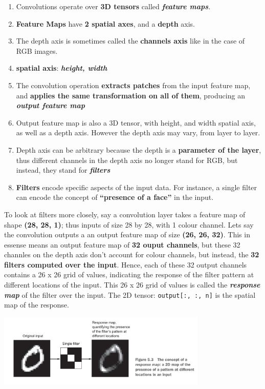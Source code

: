 \documentclass[12pt, a4paper]{article}
\begin{document}
\begin{enumerate}
\item Convolutions operate over \textbf{3D tensors} called \textbf{\textit{feature maps}}.
\item \textbf{Feature Maps} have \textbf{2 spatial axes}, and a \textbf{depth} axis.
\item The depth axis is sometimes called the \textbf{channels axis} like in the case of RGB images.
\item \textbf{spatial axis}: \textbf{\textit{height, width}}
\item The convolution operation \textbf{extracts patches} from the input feature map, and
\textbf{applies the same transformation on all of them}, producing an \textbf{\textit{output feature map}}
\item Output feature map is also a 3D tensor, with height, and width spatial axis,
as well as a depth axis. However the depth axis may vary, from layer to layer.
\item Depth axis can be arbitrary because the depth is a \textbf{parameter of the layer},
thus different channels in the depth axis no longer stand for RGB, but instead,
they stand for \textbf{\textit{filters}}
\item \textbf{Filters} encode specific aspects of the input data. For instance, a 
single filter can encode the concept of \textbf{``presence of a face''} in the input.
\end{enumerate}

To look at filters more closely, say a convolution layer takes a feature map of
shape \textbf{(28, 28, 1)}; thus inputs of size 28 by 28, with 1 colour channel.
Lets say the convolution outputs a an output feature map of size \textbf{(26, 26, 32)}.
This in essense means an output feature map of \textbf{32 ouput channels}, but these 32 channles on the depth axis 
don't account for colour channels, but instead, the \textbf{32 filters computed over the input}.
Hence, each of these 32 output channels contains a 26 x 26 grid of values, indicating the response of the filter pattern 
at different locations of the input. This 26 x 26 grid of values is called the \textbf{\textit{response map}} of the filter over the input.
The 2D tensor: \lstinline{output[:, :, n]} is the spatial map of the response. \\

{
   \centering
   \includegraphics[width=10cm]{concept_response_map.png}

}
\end{document}
